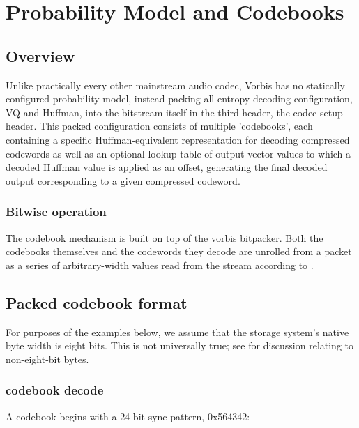 \section{Probability Model and Codebooks} \label{vorbis:spec:codebook}

\subsection{Overview}

Unlike practically every other mainstream audio codec, Vorbis has no
statically configured probability model, instead packing all entropy
decoding configuration, VQ and Huffman, into the bitstream itself in
the third header, the codec setup header.  This packed configuration
consists of multiple 'codebooks', each containing a specific
Huffman-equivalent representation for decoding compressed codewords as
well as an optional lookup table of output vector values to which a
decoded Huffman value is applied as an offset, generating the final
decoded output corresponding to a given compressed codeword.

\subsubsection{Bitwise operation}
The codebook mechanism is built on top of the vorbis bitpacker. Both
the codebooks themselves and the codewords they decode are unrolled
from a packet as a series of arbitrary-width values read from the
stream according to .




\subsection{Packed codebook format}

For purposes of the examples below, we assume that the storage
system's native byte width is eight bits.  This is not universally
true; see  for discussion
relating to non-eight-bit bytes.

\subsubsection{codebook decode}

A codebook begins with a 24 bit sync pattern, 0x564342:

